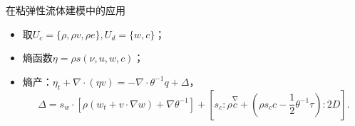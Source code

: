 \documentclass[mathserif]{beamer}
\begin{document}
\begin{frame}{在粘弹性流体建模中的应用}
\begin{itemize}
	\item<2-> 取$U_c = \{ \rho,\rho v,\rho e\},U_d =\{ w,c\}$；
	\item<3-> 熵函数$\eta = \rho s(\nu,u,w,c)$；
	\item<4-> 熵产：$\eta_t + \nabla \cdot (\eta v) %
		= -\nabla \cdot \theta^{-1} q+ \Delta$，
		$$\Delta = s_w \cdot [\rho (w_t + v \cdot \nabla w) + \nabla \theta^{-1}] + [ s_c:\rho \stackrel{\nabla}{c} + (\rho s_c c - \frac{1}{2} \theta^{-1} \tau): 2 D].$$
\end{itemize}
\end{frame}
\end{document}
